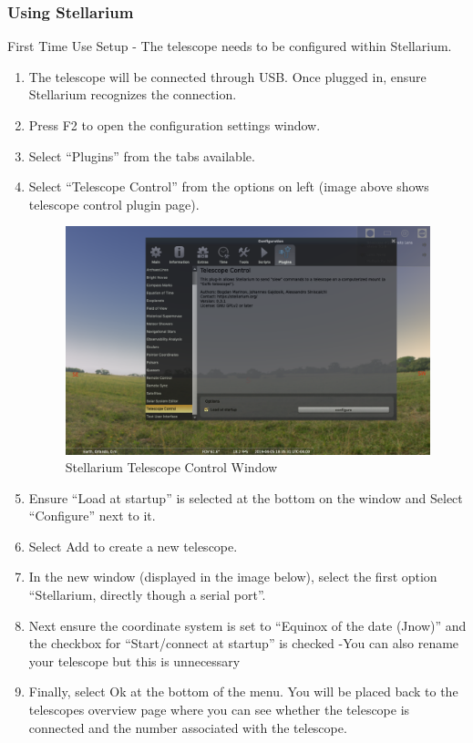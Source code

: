 \documentclass[12pt]{article}
\begin{document}
\subsubsection{Using Stellarium}

First Time Use Setup - The telescope needs to be configured within Stellarium.
\begin{enumerate}
\item The telescope will be connected through USB. Once plugged in, ensure Stellarium recognizes the connection.
\item Press F2 to open the configuration settings window.
\item Select “Plugins” from the tabs available.
\item Select “Telescope Control” from the options on left (image above shows telescope control plugin page).

\begin{figure}[h]
	\centering
	\includegraphics[width=0.75\linewidth]{stellTeleWindow}
	\caption{Stellarium Telescope Control Window}
  \label{fig:stellTeleWindow}
\end{figure}

\item Ensure “Load at startup” is selected at the bottom on the window and Select “Configure” next to it.
\item Select Add to create a new telescope.
\item In the new window (displayed in the image below), select the first option “Stellarium, directly though a serial port”.
\item Next ensure the coordinate system is set to “Equinox of the date (Jnow)” and the checkbox for “Start/connect at startup” is checked
    -You can also rename your telescope but this is unnecessary
\item Finally, select Ok at the bottom of the menu. You will be placed back to the telescopes overview page where you can see whether the telescope is connected and the number associated with the telescope.
\end{enumerate}
\end{document}
